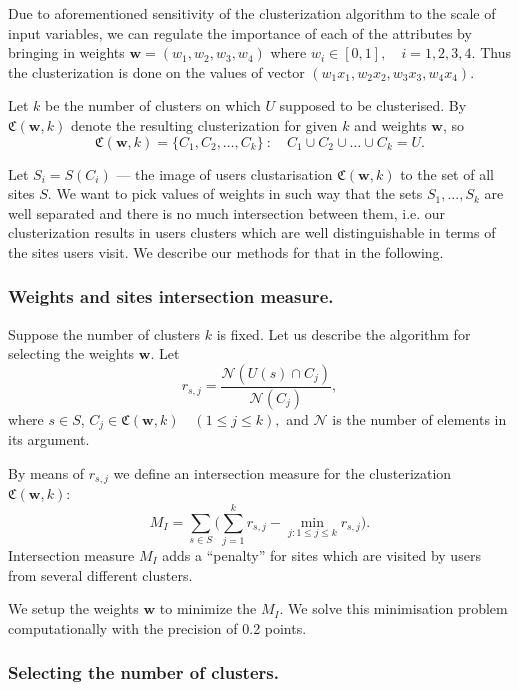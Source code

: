 \documentclass[runningheads,a4paper]{llncs}
\begin{document}
Due to aforementioned sensitivity of the clusterization algorithm to the scale of input variables, we can regulate the importance of each of the attributes by bringing in weights $\boldsymbol{w} = (w_1, w_2, w_3, w_4)$ where \quad $w_i \in [0, 1], \quad i = 1,2,3,4$. Thus the clusterization is done on the values of vector $(w_1 x_1, w_2 x_2, w_3 x_3, w_4 x_4)$.

Let $k$ be the number of clusters on which $U$ supposed to be clusterised. By $\mathfrak{C}(\boldsymbol{w}, k)$ denote the resulting clusterization for given $k$ and weights $\boldsymbol{w}$, so
\[
	\mathfrak{C}(\boldsymbol{w}, k) = \{C_1, C_2, \dots, C_k\} \  \colon  \quad  C_1 \cup C_2 \cup \dots \cup C_k = U.
\]

Let $S_i = S(C_i)$ --- the image of users clustarisation $\mathfrak{C}(\boldsymbol{w}, k)$ to the set of all sites $S$. We want to pick values of weights in such way that the sets $S_1, ..., S_k$ are well separated and there is no much intersection between them, i.e. our clusterization results in users clusters which are well distinguishable in terms of the sites users visit. We describe our methods for that in the following.



\subsubsection{Weights and sites intersection measure.}

Suppose the number of clusters $k$ is fixed. Let us describe the algorithm for selecting the weights $\boldsymbol{w}$. Let
\[
	r_{s,j} = \frac{\mathcal{N}(U(s) \cap C_j)}{\mathcal{N}(C_j)},
\]
where $s \in S$, $C_j \in \mathfrak{C}(\boldsymbol{w}, k) \quad (1 \leq j \leq k ),$ and $\mathcal{N}$ is the number of elements in its argument.

By means of $r_{s,j}$ we define an intersection measure for the clusterization $\mathfrak{C}(\boldsymbol{w}, k)$:
\[
	M_I = \sum_{s \in S} \Big( \sum_{j=1}^{k} r_{s,j} - \min_{j\colon 1 \leq j \leq k} r_{s,j} \Big).
\]
Intersection measure $M_I$ adds a ``penalty'' for sites which are visited by users from several different clusters.

We setup the weights $\boldsymbol{w}$ to minimize the $M_I$. We solve this minimisation problem computationally with the precision of 0.2 points.



\subsubsection{Selecting the number of clusters.}
\end{document}
